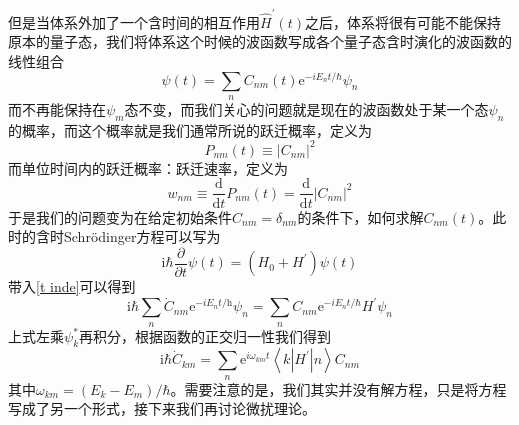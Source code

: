 \documentclass[12pt,a4paper,openany,twoside]{book}
\numberwithin{equation}{section}
\newcommand{\sch}{Schr\"odinger}
\begin{document}
          但是当体系外加了一个含时间的相互作用$\hat{H}^{\prime}(t)$之后，体系将很有可能不能保持原本的量子态，我们将体系这个时候的波函数写成各个量子态含时演化的波函数的线性组合
          \begin{equation}
            \psi(t)=\sum_{n} C_{n m}(t) \mathrm{e}^{-i E_{n} t / \hbar} \psi_{n}
            \label{t inde}
          \end{equation}
          而不再能保持在$\psi_m$态不变，而我们关心的问题就是现在的波函数处于某一个态$\psi_n$的概率，而这个概率就是我们通常所说的跃迁概率，定义为
          \begin{equation}
            P_{nm}(t)\equiv \left|C_{nm}\right|^2
          \end{equation}
          而单位时间内的跃迁概率：跃迁速率，定义为
          \begin{equation}
            w_{nm} \equiv \frac{\mathrm{d}}{\mathrm{d} t} P_{nm}(t)=\frac{\mathrm{d}}{\mathrm{d} t} \left|C_{nm}\right|^2
          \end{equation}
          于是我们的问题变为在给定初始条件$C_{nm} = \delta_{nm}$的条件下，如何求解$C_{nm}(t)$。此时的含时\sch 方程可以写为
          \begin{equation}
            \mathrm{i} \hbar \frac{\partial}{\partial t} \psi(t)=\left(H_{0}+H^{\prime}\right) \psi(t)
          \end{equation}
          带入\ref{t inde}可以得到
          \begin{equation}
            \mathrm{i} \hbar \sum_{n} \dot{C}_{n m} \mathrm{e}^{-i E_{n} t / \mathrm{h}} \psi_{n}=\sum_{n} C_{n m} \mathrm{e}^{-i E_{n} t / \hbar} H^{\prime} \psi_{n}
          \end{equation}
          上式左乘$\psi_k^{*}$再积分，根据函数的正交归一性我们得到
          \begin{equation}
            \mathrm{i} \hbar \dot{C}_{km}=\sum_{n} \mathrm{e}^{i \omega_{km} t}\left\langle k\left|H^{\prime}\right| n\right\rangle C_{nm}
          \end{equation}
          其中$\omega_{km}=(E_{k}-E_m)/\hbar$。需要注意的是，我们其实并没有解方程，只是将方程写成了另一个形式，接下来我们再讨论微扰理论。
\end{document}
